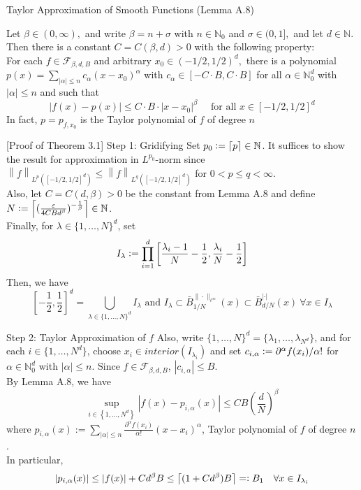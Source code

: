 \documentclass{if-beamer}
\newcommand{\defeq}{\vcentcolon=}
\newcommand{\eqdef}{=\vcentcolon}
\newcommand{\norm}[2]{\left\lVert#1\right\rVert_{#2}}
\begin{document}
\begin{frame}{Taylor Approximation of Smooth Functions (Lemma A.8)}
    \begin{tcolorbox}
        Let $\beta \in(0, \infty),$ and write $\beta=n+\sigma$ with $n \in \mathbb{N}_{0}$ and $\sigma \in(0,1],$ and let $d \in \mathbb{N} .$ Then there is a constant $C=C(\beta, d)>0$ with the following property:\\
        For each $f \in \mathcal{F}_{\beta, d, B}$ and arbitrary $x_{0} \in(-1 / 2,1 / 2)^{d},$ there is a polynomial $p(x)=\sum_{|\alpha| \leq n} c_{\alpha}\left(x-x_{0}\right)^{\alpha}$ with $c_{\alpha} \in[-C \cdot B, C \cdot B]$ for all $\alpha \in \mathbb{N}_{0}^{d}$ with $|\alpha| \leq n$ and such that
        \[
        |f(x)-p(x)| \leq C \cdot B \cdot\left|x-x_{0}\right|^{\beta} \quad \text { for all } x \in[-1 / 2,1 / 2]^{d}
        \]
        In fact, $p=p_{f, x_{0}}$ is the Taylor polynomial of $f$ of degree $n$
    \end{tcolorbox}
    
\end{frame}

\begin{frame}{[Proof of Theorem 3.1] Step 1: Gridifying}
    Set $p_0 \defeq \left\lceil p \right\rceil \in \mathbb{N}$. It suffices to show the result for approximation in $L^{p_0}$-norm since $\norm{f}{L^p\left([-1/2, 1/2]^{d}\right)} \leq \norm{f}{L^q\left([-1/2, 1/2]^{d}\right)}$ for $0<p\leq q <\infty$.\\
    Also, let $C=C(d, \beta) > 0$ be the constant from Lemma A.8 and define $N \defeq \left\lceil (\frac{\varepsilon}{4CBd^{\beta}})^{-\frac{1}{\beta}} \right\rceil \in \mathbb{N}$.\\
    Finally, for $\lambda \in \{1,\dots,N\}^d$, set $$I_{\lambda} \defeq \prod_{i=1}^d \left[ \frac{\lambda_i - 1}{N} - \frac{1}{2}, \frac{\lambda_i}{N} - \frac{1}{2} \right] $$
    Then, we have $$\left[-\frac{1}{2}, \frac{1}{2} \right]^d = \bigcup_{\lambda \in \{1,\dots,N\}^d}I_{\lambda} \text{ and } I_{\lambda} \subset \bar{B}_{1 / N}^{\|\cdot\|_{\ell^{\infty}}}(x) \subset \bar{B}_{d / N}^{|\cdot|}(x) \ \forall x \in I_{\lambda}  $$
\end{frame}


\begin{frame}{Step 2: Taylor Approximation of $f$}
    Also, write $\{1,\dots, N \}^d = \{\lambda_1,\dots,\lambda_{N^d} \}$, and for each $i \in \{1,\dots,N^d \}$, choose $x_i \in interior(I_{\lambda_i})$ and set $c_{i,\alpha} \defeq \partial^{\alpha}f(x_i)/\alpha!$ for $\alpha \in \mathbb{N}_0^d$ with $|\alpha| \leq n$. Since $f \in \mathcal{F}_{\beta, d, B}$, $|c_{i,\alpha}| \leq B$.\\
    By Lemma A.8, we have $$ \sup _{i \in\left\{1, \ldots, N^{d}\right\}}\left|f(x)-p_{i, \alpha}(x)\right| \leq C B\left(\frac{d}{N}\right)^{\beta}$$ where $p_{i, \alpha}(x):=\sum_{|\alpha| \leq n} \frac{\partial^{\alpha} f\left(x_{i}\right)}{\alpha !}\left(x-x_{i}\right)^{\alpha}$, Taylor polynomial of $f$ of degree $n$.\\
    In particular, $$ |p_{i, \alpha}(x)| \leq |f(x)| + Cd^{\beta}B \leq \left\lceil (1+Cd^{\beta})B\right\rceil \eqdef B_1 \quad \forall x \in I_{\lambda_i}$$
\end{frame}
\end{document}
